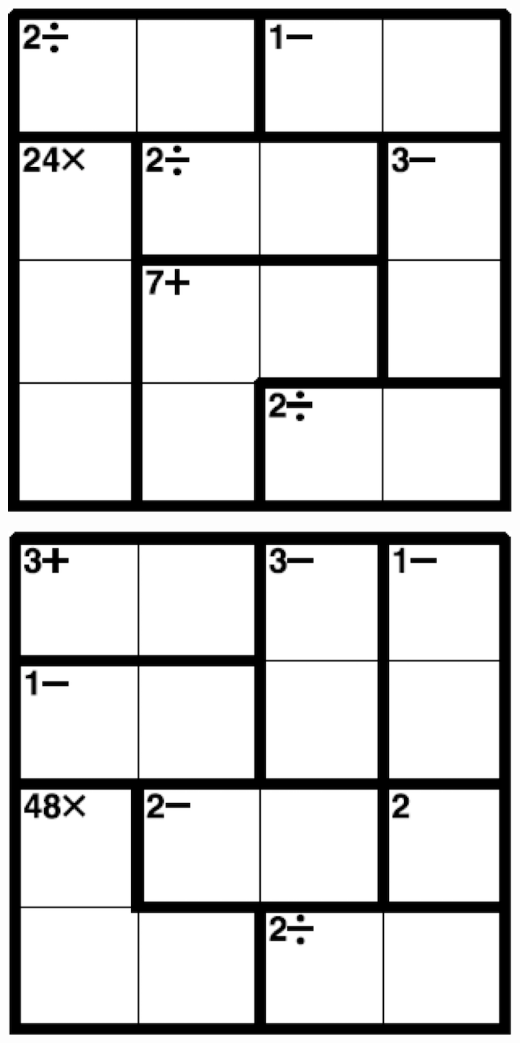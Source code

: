 
\includegraphics[scale=1]{Gambar/Lampiran/4x4_33.png}

\includegraphics[scale=1]{Gambar/Lampiran/4x4_34.png}
